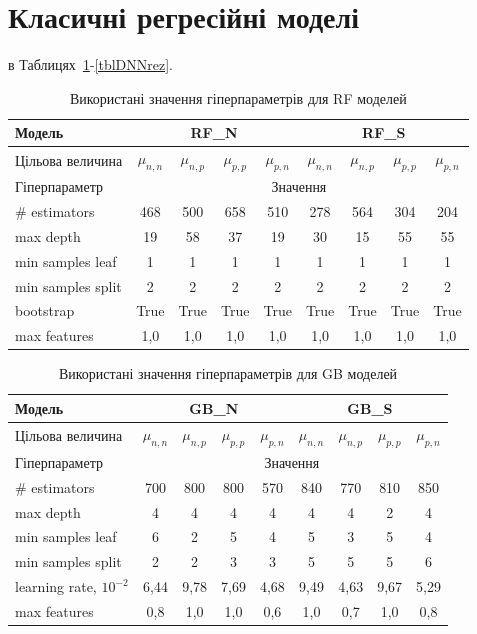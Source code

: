 \documentclass[12pt,a4paper,titlepage,oneside]{book}
\numberwithin{equation}{part}
\begin{document}
\section{Класичні регресійні моделі}

в Таблицях~\ref{tblRFrez}-\ref{tblDNNrez}.

\begin{table}
\setlength{\tabcolsep}{3pt}
\caption{Використані значення гіперпараметрів для RF моделей}
\label{tblRFrez}
\centering
\begin{tabular}{|l|c|c|c|c|c|c|c|c|}
\hline
Модель& \multicolumn{4}{c|}{RF\_N}& \multicolumn{4}{c|}{RF\_S} \rule{0pt}{11pt}\\
\hline
Цільова величина&$\mu_{n,n}$&$\mu_{n,p}$&$\mu_{p,p}$&$\mu_{p,n}$&$\mu_{n,n}$&$\mu_{n,p}$&$\mu_{p,p}$&$\mu_{p,n}$\\
\hline
Гіперпараметр&\multicolumn{8}{c|}{Значення}\\
\hline
\# estimators&468&500&658&510&278&564&304&204\\
\hline
max depth&19&58&37&19&30&15&55&55\\
\hline
min samples leaf &1&1&1&1&1&1&1&1\\
\hline
min samples split	&2&2&2&2&2&2&2&2\\
\hline
bootstrap	&True&True&True&True&True&True&True&True\\
\hline
max features &1,0&1,0&1,0&1,0&1,0&1,0&1,0&1,0\\
\hline
\end{tabular}
\end{table}


\begin{table}[!ht]
\setlength{\tabcolsep}{3pt}
\caption{Використані значення гіперпараметрів для GB моделей}
\label{tblGBrez}
\centering
\begin{tabular}{|l|c|c|c|c|c|c|c|c|}
\hline
Модель& \multicolumn{4}{c|}{GB\_N}& \multicolumn{4}{c|}{GB\_S} \rule{0pt}{11pt}\\
\hline
Цільова величина&$\mu_{n,n}$&$\mu_{n,p}$&$\mu_{p,p}$&$\mu_{p,n}$&$\mu_{n,n}$&$\mu_{n,p}$&$\mu_{p,p}$&$\mu_{p,n}$\\
\hline
Гіперпараметр&\multicolumn{8}{c|}{Значення}\\
\hline
\# estimators&700&800&800&570&840&770&810&850\\
\hline
max depth&4&4&4&4&4&4&2&4\\
\hline
min samples leaf &6&2&5&4&5&3&5&4\\
\hline
min samples split	&2&2&3&3&5&5&5&6\\
\hline
learning rate, $10^{-2}$	&6,44&9,78&7,69&4,68&9,49&4,63&9,67&5,29\\
\hline
max features &0,8&1,0&1,0&0,6&1,0&0,7&1,0&0,8\\
\hline
\end{tabular}
\end{table}
\end{document}
